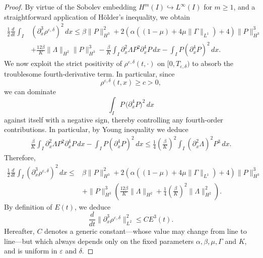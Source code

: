 \documentclass[12pt]{amsart}
\newcommand{\D}{\,d}
\begin{document}
\begin{proof}
        By virtue of  the Sobolev embedding $H^m(I)\hookrightarrow L^\infty(I)$ for $m\ge1$, and a straightforward application of Hölder’s inequality, we obtain
        \begin{equation*}
            \begin{split}
                \frac{1}{2}\frac{d}{dt}\int_I &(\partial_{x}^3\rho^{\varepsilon,\delta})^2 \D x\leq \beta \|P\|_{H^3}^2+ 2(\alpha((1-\mu)+4\mu\|\Gamma\|_{L^1} )+4 )\|P\|_{H^3}^3\\
                &+\frac{12\beta}{K}\|\Lambda\|_{H^2}\|P\|_{H^3}^3-\frac{\beta}{K} \int_I \partial_x^2 \Lambda  P^2 \partial_x^4 P \D x-\int_I P( \partial_x^4 P)^2\D x.
            \end{split}
        \end{equation*}
        We now exploit the strict positivity of $\rho^{\varepsilon,\delta}(t,\cdot)$ on $[0,T_{\varepsilon,\delta})$ to absorb the troublesome fourth‐derivative term.  In particular, since
$$
\rho^{\varepsilon,\delta}(t,x)\ge c>0,
$$
we can dominate
$$
\int_I P\,\bigl(\partial_x^4 P\bigr)^2\,dx
$$
against itself with a negative sign, thereby controlling any  fourth‐order contributions. In particular, by Young inequality we deduce
        \begin{equation*}
            \begin{split}
                \frac{\beta}{K} \int_I \partial_x^2 \Lambda   P^2 \partial_x^4 P \D x -\int_I P(\partial_x^4 P)^2 \D x\leq \frac{1}{4}\left( \frac{\beta}{K}\right)^2 \int_I (\partial_{x}^2\Lambda)^{2} P^3 \D x.
            \end{split}
        \end{equation*}
        Therefore,
        \begin{equation*}
            \begin{split}
                \frac{1}{2}\frac{d}{dt}\int_I(\partial_{x}^3\rho^{\varepsilon,\delta})^2\D x \leq& \beta \|P\|_{H^3}^2+ 2(\alpha((1-\mu)+4\mu\|\Gamma\|_{L^1} )+4 )\|P\|_{H^3}^3\\
                &+ \|P\|_{H^3}^3\left( \frac{12\beta}{K}\|\Lambda\|_{H^2}
                +\frac{1}{4}\left( \frac{\beta}{K}\right)^2 \|\Lambda\|_{H^2}^2\right).
            \end{split}
        \end{equation*}
        By definition of $E(t)$, we deduce
        \begin{equation*}
            \frac{d}{dt}\|\partial_{x}^3\rho^{\varepsilon,\delta}\|_{L^2}^2\leq  CE^3(t) .
        \end{equation*}
       Hereafter, $C$ denotes a generic constant—whose value may change from line to line—but which always depends only on the fixed parameters $\alpha,\beta,\mu,\Gamma$ and $K$, 
 and is uniform in $\varepsilon$ and $\delta$.



\end{proof}
\end{document}

